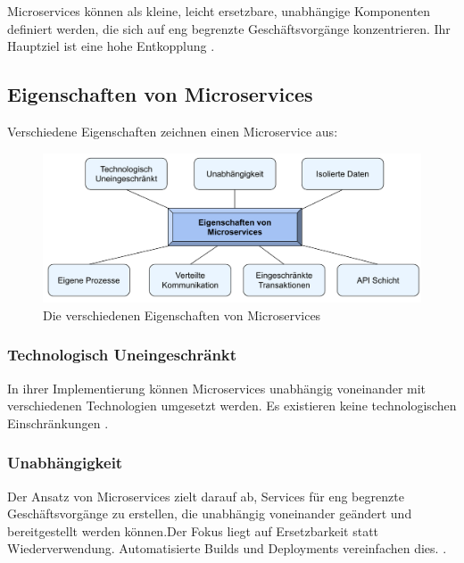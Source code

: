 {Microservices können als kleine, leicht ersetzbare, unabhängige Komponenten definiert werden, die sich auf eng begrenzte Geschäftsvorgänge konzentrieren. Ihr Hauptziel ist eine hohe Entkopplung \cite[S.252]{richards} \cite[S.5,6]{fowlersusan} \cite[S.152]{sommerville} \cite[S.113]{erl} \cite[S.22-23]{newman}.

\pagebreak
\subsection{Eigenschaften von Microservices}

Verschiedene Eigenschaften zeichnen einen Microservice aus:

\begin{figure}[ht]
\centering
\includegraphics[width=\textwidth]{bilder/k2/eigenschaften.pdf}
\caption[Eigenschaften von Microservices]{Die verschiedenen Eigenschaften von Microservices}
\end{figure}

\subsubsection{Technologisch Uneingeschränkt}

In ihrer Implementierung können Microservices unabhängig voneinander mit verschiedenen Technologien umgesetzt werden. Es existieren keine technologischen Einschränkungen \cite[S. 2, 31-37]{wolff} \cite[S.154-157]{sommerville} \cite[S.24]{newman}.

\subsubsection{Unabhängigkeit}

Der Ansatz von Microservices zielt darauf ab, Services für eng begrenzte Geschäftsvorgänge zu erstellen, die unabhängig voneinander geändert und bereitgestellt werden können.Der Fokus liegt auf Ersetzbarkeit statt Wiederverwendung. Automatisierte Builds und Deployments vereinfachen dies. \cite[S. 2, 31-37]{wolff} \cite[S.22,23,28]{newman} \cite[S.154-157]{sommerville} \cite[S.128]{dowalil}.
 
}
